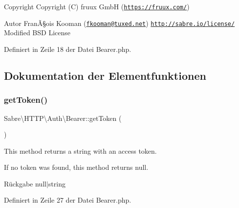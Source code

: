\begin{DoxyCopyright}{Copyright}
Copyright (C) fruux GmbH (\href{https://fruux.com/}{\tt https\+://fruux.\+com/}) 
\end{DoxyCopyright}
\begin{DoxyAuthor}{Autor}
FranÃ§ois Kooman (\href{mailto:fkooman@tuxed.net}{\tt fkooman@tuxed.\+net})  \href{http://sabre.io/license/}{\tt http\+://sabre.\+io/license/} Modified B\+SD License 
\end{DoxyAuthor}


Definiert in Zeile 18 der Datei Bearer.\+php.



\subsection{Dokumentation der Elementfunktionen}
\mbox{\label{class_sabre_1_1_h_t_t_p_1_1_auth_1_1_bearer_a4daccf2b0072a63872d46c7cdef2746c}} 
\subsubsection{\texorpdfstring{get\+Token()}{getToken()}}
{\footnotesize\ttfamily Sabre\textbackslash{}\+H\+T\+T\+P\textbackslash{}\+Auth\textbackslash{}\+Bearer\+::get\+Token (\begin{DoxyParamCaption}{ }\end{DoxyParamCaption})}

This method returns a string with an access token.

If no token was found, this method returns null.

\begin{DoxyReturn}{Rückgabe}
null$\vert$string 
\end{DoxyReturn}


Definiert in Zeile 27 der Datei Bearer.\+php.

\mbox{\label{class_sabre_1_1_h_t_t_p_1_1_auth_1_1_bearer_a8b5df77b50fc94ce64b11e7ca103573c}} 
